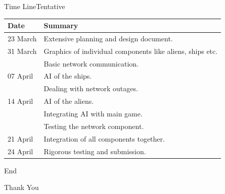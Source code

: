\documentclass{beamer}
\begin{document}
\begin{frame}{Time Line}{Tentative}
	  \begin{center}
    \begin{tabular}{ | l | p{9cm} |}
    \hline
    Date &  Summary \\ \hline
    23 March & Extensive planning and design document. \\ \hline
    31 March & Graphics of individual components like aliens, ships etc. \\ & Basic network communication.\\ \hline
    07 April & AI of the ships.\\ &  Dealing with network outages.\\ \hline
    14 April & AI of the aliens. \\ & Integrating AI with main game.\\ & Testing the network component. \\ \hline
    21 April & Integration of all components together. \\ \hline
    24 April & Rigorous testing and submission. \\ 
    \hline
    \end{tabular}
\end{center}
\end{frame}

\begin{frame}{End}
	\vfill
	\begin{center}
		\Huge{Thank You}
	\end{center}
	\vfill
\end{frame}
\end{document}
